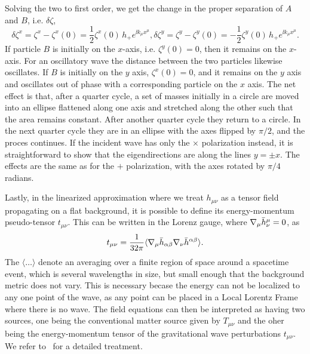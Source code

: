 Solving the two to first order, we get the change in the proper separation 
of $A$ and $B$, i.e. $\delta\zeta$,
\begin{subequations}
 \begin{equation}
  \delta\zeta^x = \zeta^x - \zeta^x(0) = \frac{1}{2}\zeta^x(0)\,h_+ e^{\ii k_\mu x^\mu},
 \end{equation}
 \begin{equation}
  \delta\zeta^y = \zeta^y - \zeta^y(0) = -\frac{1}{2}\zeta^y(0)\,h_+ e^{\ii k_\mu x^\mu}. 
 \end{equation}
\end{subequations}
If particle $B$ is initially on the $x$-axis, i.e. $\zeta^y(0) = 0$, 
then it remains on the $x$-axis.  For an oscillatory wave the
distance between the two particles likewise oscillates.  
If $B$ is initially on the $y$ axis, $\zeta^x(0) = 0$, and it remains
on the $y$ axis and oscillates out of phase with a corresponding 
particle on the $x$ axis. The net effect is that,
after a quarter cycle, a set of masses initially in a circle are moved
into an ellipse flattened along one axis and stretched along the other
such that the area remains constant.  After another quarter cycle they
return to a circle. In the next quarter cycle they are in an ellipse
with the axes flipped by $\pi /2$, and the proces continues. 
If the incident wave has only the $\times$ polarization instead, 
it is straightforward to show that the eigendirections are along
the lines $y=\pm x$.  The effects are the same as for the $+$
polarization, with the axes rotated by $\pi /4$ radians.

Lastly, in the linearized approximation where we treat $h_{\mu\nu}$ as 
a tensor field propagating on a flat background, it is possible to 
define its energy-momentum pseudo-tensor $t_{\mu\nu}$. This can be written 
in the Lorenz gauge, where $\nabla_\mu \bar{h}^\mu_\nu = 0$, as
\begin{equation}\label{eq:h_energy_pseudotensor}
 t_{\mu\nu} = \frac{1}{32\pi}\langle \cd_\mu \hbarr_{\alpha\beta} \cd_\nu \hbarr^{\alpha\beta} \rangle.
\end{equation}
The $\langle\dots\rangle$ denote an averaging over a finite region
of space around a spacetime event, which is several wavelengths in size,
but small enough that the background metric does not vary. This is necessary
becase the energy can not be localized to any one point of the wave,
as any point can be placed in a Local Lorentz Frame where there is no wave.
The field equations can then be 
interpreted as having two sources, one being the conventional matter
source given by $T_{\mu\nu}$ and the oher being the energy-momentum
tensor of the gravitational wave perturbations $t_{\mu\nu}$. We refer 
to~\cite{mtw,RevModPhys.29.509} for a detailed treatment.


